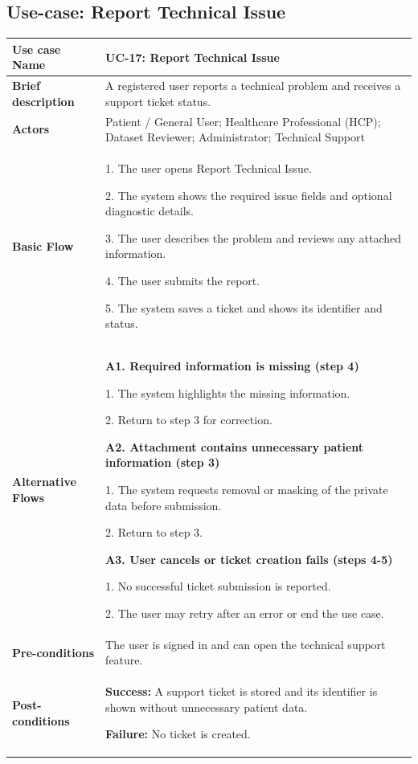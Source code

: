 \subsection{Use-case: Report Technical Issue}
\label{uc:uc-17}
\begin{longtable}{|p{}|p{}|}
\hline
\textbf{Use case Name} & UC-17: Report Technical Issue \\ \hline
\textbf{Brief description} & A registered user reports a technical problem and receives a support ticket status. \\ \hline
\textbf{Actors} & Patient / General User; Healthcare Professional (HCP); Dataset Reviewer; Administrator; Technical Support \\ \hline
\textbf{Basic Flow} &
1. The user opens Report Technical Issue.\par
2. The system shows the required issue fields and optional diagnostic details.\par
3. The user describes the problem and reviews any attached information.\par
4. The user submits the report.\par
5. The system saves a ticket and shows its identifier and status.
\\ \hline
\textbf{Alternative Flows} &
\textbf{A1. Required information is missing (step 4)}\par
1. The system highlights the missing information.\par
2. Return to step 3 for correction.
\par\smallskip
\textbf{A2. Attachment contains unnecessary patient information (step 3)}\par
1. The system requests removal or masking of the private data before submission.\par
2. Return to step 3.
\par\smallskip
\textbf{A3. User cancels or ticket creation fails (steps 4-5)}\par
1. No successful ticket submission is reported.\par
2. The user may retry after an error or end the use case.
\\ \hline
\textbf{Pre-conditions} & The user is signed in and can open the technical support feature. \\ \hline
\textbf{Post-conditions} & \textbf{Success:} A support ticket is stored and its identifier is shown without unnecessary patient data.\par
\textbf{Failure:} No ticket is created. \\ \hline
\end{longtable}

